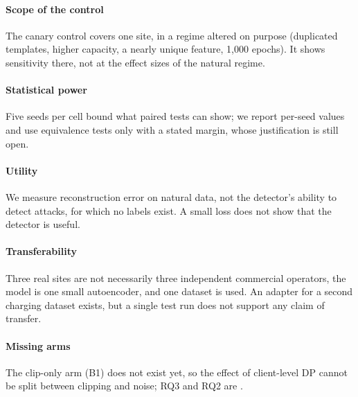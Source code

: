 \paragraph{Scope of the control} The canary control covers one site, in a
regime altered on purpose (duplicated templates, higher capacity, a nearly
unique feature, 1{,}000 epochs). It shows sensitivity there, not at the effect
sizes of the natural regime.

\paragraph{Statistical power} Five seeds per cell bound what paired tests can
show; we report per-seed values and use equivalence tests only with a stated
margin, whose justification is still open.

\paragraph{Utility} We measure reconstruction error on natural data, not the
detector's ability to detect attacks, for which no labels exist. A small loss
does not show that the detector is useful.

\paragraph{Transferability} Three real sites are not necessarily three
independent commercial operators, the model is one small autoencoder, and one
dataset is used. An adapter for a second charging dataset exists, but a single
test run does not support any claim of transfer.

\paragraph{Missing arms} The clip-only arm (B1) does not exist yet, so the
effect of client-level DP cannot be split between clipping and noise; RQ3 and
RQ2 are .
